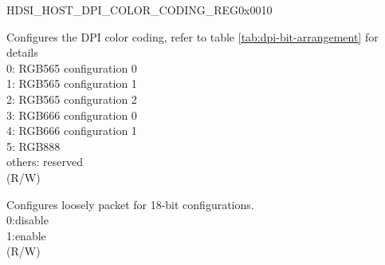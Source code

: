 \begin{register}{H}{DSI\_HOST\_DPI\_COLOR\_CODING\_REG}{0x0010}\label{regdesc:DSIHOSTDPICOLORCODINGREG}
%
%
%
%
\regnewline%
\begin{regdesc}\begin{reglist}
\label{fielddesc:DSIHOSTDPICOLORCODING}\item [DSI\_HOST\_DPI\_COLOR\_CODING] Configures the DPI color coding, refer to table \ref{tab:dpi-bit-arrangement} for details\\
0: RGB565 configuration 0\\
1: RGB565 configuration 1\\
2: RGB565 configuration 2\\
3: RGB666 configuration 0\\
4: RGB666 configuration 1\\
5: RGB888\\
others: reserved\\
(R/W)
\label{fielddesc:DSIHOSTLOOSELY18EN}\item [DSI\_HOST\_LOOSELY18\_EN] Configures loosely packet for 18-bit configurations.\\0:disable\\1:enable\\ (R/W)
\end{reglist}\end{regdesc}
\end{register}


